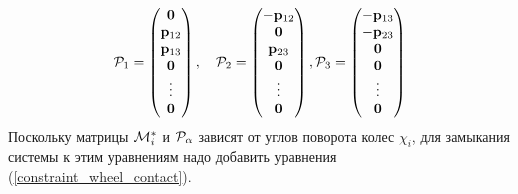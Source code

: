 $$ 
\mathcal{P}_1 = \left(
\begin{matrix}
 \boldsymbol{\mathbf{0}} \\
 \mathbf{p}_{12}\\
\mathbf{p}_{13}\\
\boldsymbol{\mathbf{0}}\\
\vdots\\
\boldsymbol{\mathbf{0}}
\end{matrix}
\right),\quad
\mathcal{P}_2 = \left(
\begin{matrix}
-\mathbf{p}_{12}\\
\boldsymbol{\mathbf{0}}\\
\mathbf{p}_{23}\\
\boldsymbol{\mathbf{0}}\\
\vdots\\
\boldsymbol{\mathbf{0}}
\end{matrix}
\right),
\mathcal{P}_3 = \left(
\begin{matrix}
-\mathbf{p}_{13}\\
-\mathbf{p}_{23}\\
\boldsymbol{\mathbf{0}}\\
\boldsymbol{\mathbf{0}}\\
\vdots\\
\boldsymbol{\mathbf{0}}
\end{matrix}
\right)
$$
Поскольку матрицы $\mathcal{M}^*_i$ и $\mathcal{P}_\alpha$ зависят от углов поворота колес $\chi_i$, для замыкания системы к этим уравнениям надо добавить уравнения
(\ref{constraint_wheel_contact}).

